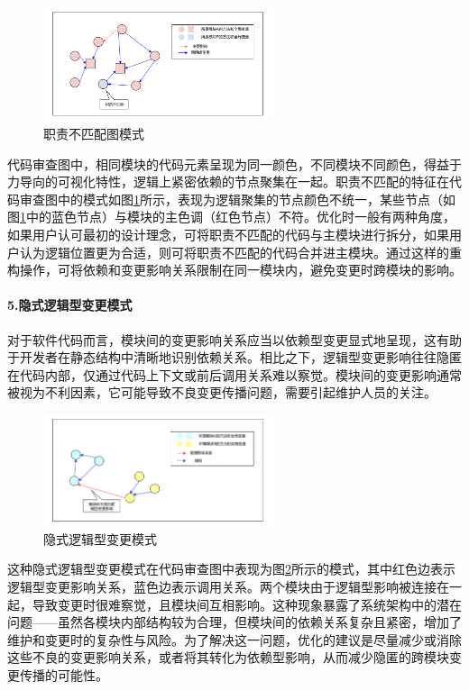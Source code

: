 \begin{figure}[h]
\centering
\includegraphics[width = 0.6\textwidth]{figures/职责不匹配_2.pdf}
\caption{职责不匹配图模式}
\label{1_职责不匹配图模式}
\end{figure}

代码审查图中，相同模块的代码元素呈现为同一颜色，不同模块不同颜色，得益于力导向的可视化特性，逻辑上紧密依赖的节点聚集在一起。职责不匹配的特征在代码审查图中的模式如图\ref{1_职责不匹配图模式}所示，表现为逻辑聚集的节点颜色不统一，某些节点（如图\ref{1_职责不匹配图模式}中的蓝色节点）与模块的主色调（红色节点）不符。优化时一般有两种角度，如果用户认可最初的设计理念，可将职责不匹配的代码与主模块进行拆分，如果用户认为逻辑位置更为合适，则可将职责不匹配的代码合并进主模块。通过这样的重构操作，可将依赖和变更影响关系限制在同一模块内，避免变更时跨模块的影响。


\paragraph{5.隐式逻辑型变更模式} 对于软件代码而言，模块间的变更影响关系应当以依赖型变更显式地呈现，这有助于开发者在静态结构中清晰地识别依赖关系。相比之下，逻辑型变更影响往往隐匿在代码内部，仅通过代码上下文或前后调用关系难以察觉。模块间的变更影响通常被视为不利因素，它可能导致不良变更传播问题，需要引起维护人员的关注。

\begin{figure}[h]
\centering
\includegraphics[width = 0.6\textwidth]{figures/4_不良变更影响.pdf}
\caption{隐式逻辑型变更模式}
\label{1_不良的逻辑型变更影响}
\end{figure}


这种隐式逻辑型变更模式在代码审查图中表现为图\ref{1_不良的逻辑型变更影响}所示的模式，其中红色边表示逻辑型变更影响关系，蓝色边表示调用关系。两个模块由于逻辑型影响被连接在一起，导致变更时很难察觉，且模块间互相影响。这种现象暴露了系统架构中的潜在问题——虽然各模块内部结构较为合理，但模块间的依赖关系复杂且紧密，增加了维护和变更时的复杂性与风险。为了解决这一问题，优化的建议是尽量减少或消除这些不良的变更影响关系，或者将其转化为依赖型影响，从而减少隐匿的跨模块变更传播的可能性。


